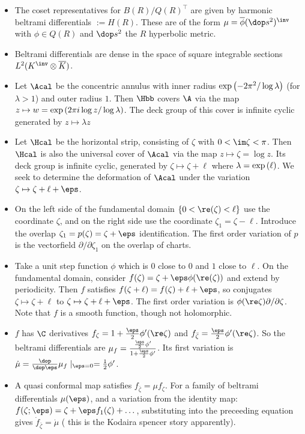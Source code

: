 \documentclass[11pt]{amsart}
\begin{document}
\begin{itemize}
  \item The coset representatives for $B(R)/Q(R)^\top$ are given by harmonic beltrami differentials $:= H(R)$. These are of the form $\mu = \overline{\phi} (\dop s^2 ) ^\inv$ with $\phi \in Q(R)$ and $\dop s^2$ the $R$ hyperbolic metric.
  \item Beltrami differentials are dense in the space of square integrable sections $L^2(K^\inv \otimes \overline{K})$. 
  \item Let $\Acal$ be the concentric annulus with inner radius $\operatorname{exp} \left( -2 \pi^2 / \log \lambda  \right)$  (for $\lambda >1$) and outer radius $1$. Then $\Hbb$ covers $\A$ via the map $z \mapsto w = \operatorname{exp} \left( 2\pi i \log z /\log \lambda  \right)$. The deck group of this cover is infinite cyclic generated by $z \mapsto \lambda z$
  \item Let $\Hcal$ be the horizontal strip, consisting of $\zeta$ with $0< \im \zeta < \pi$. Then $\Hcal$ is also the universal cover of $\Acal$ via the map $z \mapsto \zeta =\log z$. Its deck group is infinite cyclic, generated by $\zeta \mapsto \zeta +\ell$ where $\lambda = \operatorname{exp} \left( \ell \right)$. We seek to determine the deformation of $\Acal$ under the variation $ \zeta \mapsto \zeta + \ell +\eps$. 
  \item On the left side of the fundamental domain $\{ 0 < \re(\zeta) < \ell \}$ use the coordinate $\zeta$, and on the right side use the coordinate $\zeta_1=\zeta - \ell $. Introduce the overlap $\zeta_1= p(\zeta)= \zeta+\eps$ identification. The first order variation of $p$ is the vectorfield $\partial/ \partial \zeta_1$ on the overlap of charts.
  \item Take a unit step function $\phi$ which is $0$ close to $0$ and $1$ close to $\ell$. On the fundamental domain, consider $f(\zeta)=\zeta + \eps \phi(\re(\zeta))$ and extend by periodicity. Then $f$ satisfies $f(\zeta +\ell )= f(\zeta)+ \ell +\eps$, so conjugates $\zeta \mapsto \zeta+\ell$ to $\zeta \mapsto \zeta+\ell + \eps$. The first order variation is $\phi(\re\zeta) \partial / \partial\zeta $. Note that $f$ is a smooth function, though not holomorphic. 
  \item $f$ has $\C$ derivatives $f_\zeta = 1 + \frac{\eps}{2} \phi ' ( \re \zeta) $ and $f_{\bar{\zeta}} = \frac{\eps}{2} \phi' (\re \zeta)$. So the beltrami differentials are $\mu_f = \frac{\frac{\eps}{2} \phi ' }{1+ \frac{\eps}{2} \phi'}$. Its first variation is $\dot{\mu} = \frac{\dop }{\dop \eps} \mu_f \mid_{\eps =0} = \frac{1}{2} \phi'$. 
  \item A quasi conformal map satisfies $f_{\bar{\zeta}} = \mu f_\zeta$. For a family of beltrami differentials $\mu(\eps)$, and a variation from the identity map: $f(\zeta; \eps) = \zeta +\eps f_1(\zeta)+ \dots$, substituting into the preceeding equation gives $\dot{f}_{\bar{\zeta}} = \dot{\mu}$ ( this is the Kodaira spencer story apparently). 

\end{itemize}
\end{document}
